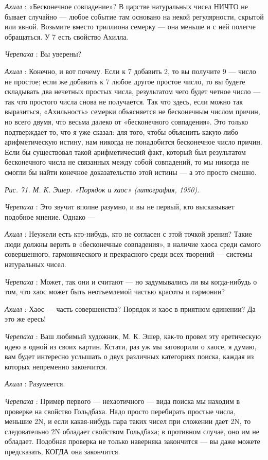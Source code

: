 \emph{Ахилл} : «Бесконечное совпадение»? В царстве натуральных чисел НИЧТО не бывает случайно --- любое событие там основано на некой регулярности, скрытой или явной. Возьмите вместо триллиона семерку --- она меньше и с ней полегче обращаться. У 7 есть свойство Ахилла.

\emph{Черепаха} : Вы уверены?

\emph{Ахилл} : Конечно, и вот почему. Если к 7 добавить 2, то вы получите 9 --- число не простое; если же добавить к 7 любое другое простое число, то вы будете складывать два нечетных простых числа, результатом чего будет четное число --- так что простого числа снова не получается. Так что здесь, если можно так выразиться, «Ахильность» семерки объясняется не бесконечным числом причин, но всего двумя, что весьма далеко от «бесконечного совпадения». Это только подтверждает то, что я уже сказал: для того, чтобы объяснить какую-либо арифметическую истину, нам никогда не понадобится бесконечное число причин. Если бы существовал такой арифметический факт, который был результатом бесконечного числа не связанных между собой совпадений, то мы никогда не смогли бы найти конечное доказательство этой истины --- а это просто смешно.

\emph{Рис. 71. М. К. Эшер. «Порядок и хаос» (литография, 1950).}

\emph{Черепаха} : Это звучит вполне разумно, и вы не первый, кто высказывает подобное мнение. Однако ---

\emph{Ахилл} : Неужели есть кто-нибудь, кто не согласен с этой точкой зрения? Такие люди должны верить в «бесконечные совпадения», в наличие хаоса среди самого совершенного, гармонического и прекрасного среди всех творений --- системы натуральных чисел.

\emph{Черепаха} : Может, так они и считают --- но задумывались ли вы когда-нибудь о том, что хаос может быть неотъемлемой частью красоты и гармонии?

\emph{Ахилл} : Хаос --- часть совершенства? Порядок и хаос в приятном единении? Да это же ересь!

\emph{Черепаха} : Ваш любимый художник, М. К. Эшер, как-то провел эту еретическую идею в одной из своих картин. Кстати, раз уж мы заговорили о хаосе, я думаю, вам будет интересно услышать о двух различных категориях поиска, каждая из которых непременно закончится.

\emph{Ахилл} : Разумеется.

\emph{Черепаха} : Пример первого --- нехаотичного --- вида поиска мы находим в проверке на свойство Гольдбаха. Надо просто перебирать простые числа, меньшие 2N, и если какая-нибудь пара таких чисел при сложении дает 2N, то следовательно 2N обладает свойством Гольдбаха; в противном случае, оно им не обладает. Подобная проверка не только наверняка закончится --- вы даже можете предсказать, КОГДА она закончится.

